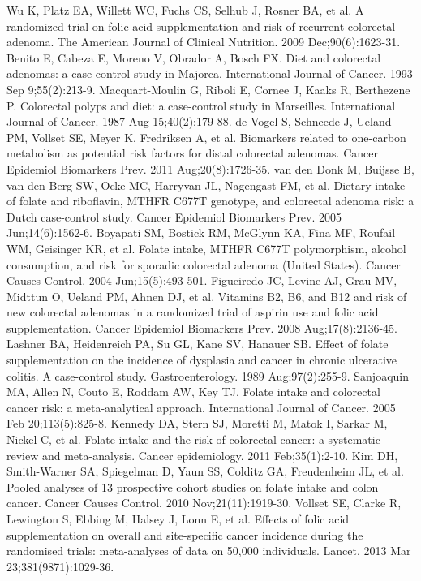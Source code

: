 \begin{thebibliography}{12}
		Wu K, Platz EA, Willett WC, Fuchs CS, Selhub J, Rosner BA, et al. A randomized trial on folic acid supplementation and risk of recurrent colorectal adenoma. The American Journal of Clinical Nutrition. 2009 Dec;90(6):1623-31. 
		Benito E, Cabeza E, Moreno V, Obrador A, Bosch FX. Diet and colorectal adenomas: a case-control study in Majorca. International Journal of Cancer. 1993 Sep 9;55(2):213-9. 
		Macquart-Moulin G, Riboli E, Cornee J, Kaaks R, Berthezene P. Colorectal polyps and diet: a case-control study in Marseilles. International Journal of Cancer. 1987 Aug 15;40(2):179-88. 
		de Vogel S, Schneede J, Ueland PM, Vollset SE, Meyer K, Fredriksen A, et al. Biomarkers related to one-carbon metabolism as potential risk factors for distal colorectal adenomas. Cancer Epidemiol Biomarkers Prev. 2011 Aug;20(8):1726-35. 
		van den Donk M, Buijsse B, van den Berg SW, Ocke MC, Harryvan JL, Nagengast FM, et al. Dietary intake of folate and riboflavin, MTHFR C677T genotype, and colorectal adenoma risk: a Dutch case-control study. Cancer Epidemiol Biomarkers Prev. 2005 Jun;14(6):1562-6. 
		Boyapati SM, Bostick RM, McGlynn KA, Fina MF, Roufail WM, Geisinger KR, et al. Folate intake, MTHFR C677T polymorphism, alcohol consumption, and risk for sporadic colorectal adenoma (United States). Cancer Causes Control. 2004 Jun;15(5):493-501. 
		Figueiredo JC, Levine AJ, Grau MV, Midttun O, Ueland PM, Ahnen DJ, et al. Vitamins B2, B6, and B12 and risk of new colorectal adenomas in a randomized trial of aspirin use and folic acid supplementation. Cancer Epidemiol Biomarkers Prev. 2008 Aug;17(8):2136-45. 
		Lashner BA, Heidenreich PA, Su GL, Kane SV, Hanauer SB. Effect of folate supplementation on the incidence of dysplasia and cancer in chronic ulcerative colitis. A case-control study. Gastroenterology. 1989 Aug;97(2):255-9. 
		Sanjoaquin MA, Allen N, Couto E, Roddam AW, Key TJ. Folate intake and colorectal cancer risk: a meta-analytical approach. International Journal of Cancer. 2005 Feb 20;113(5):825-8. 
		Kennedy DA, Stern SJ, Moretti M, Matok I, Sarkar M, Nickel C, et al. Folate intake and the risk of colorectal cancer: a systematic review and meta-analysis. Cancer epidemiology. 2011 Feb;35(1):2-10. 
		Kim DH, Smith-Warner SA, Spiegelman D, Yaun SS, Colditz GA, Freudenheim JL, et al. Pooled analyses of 13 prospective cohort studies on folate intake and colon cancer. Cancer Causes Control. 2010 Nov;21(11):1919-30. 
		Vollset SE, Clarke R, Lewington S, Ebbing M, Halsey J, Lonn E, et al. Effects of folic acid supplementation on overall and site-specific cancer incidence during the randomised trials: meta-analyses of data on 50,000 individuals. Lancet. 2013 Mar 23;381(9871):1029-36. 

\end{thebibliography}
